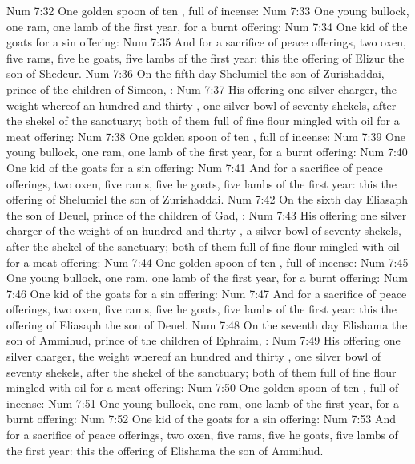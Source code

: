 \vs Num 7:32 One golden spoon of ten , full of incense:
\vs Num 7:33 One young bullock, one ram, one lamb of the first year, for a burnt offering:
\vs Num 7:34 One kid of the goats for a sin offering:
\vs Num 7:35 And for a sacrifice of peace offerings, two oxen, five rams, five he goats, five lambs of the first year: this  the offering of Elizur the son of Shedeur.
\vs Num 7:36 On the fifth day Shelumiel the son of Zurishaddai, prince of the children of Simeon, :
\vs Num 7:37 His offering  one silver charger, the weight whereof  an hundred and thirty , one silver bowl of seventy shekels, after the shekel of the sanctuary; both of them full of fine flour mingled with oil for a meat offering:
\vs Num 7:38 One golden spoon of ten , full of incense:
\vs Num 7:39 One young bullock, one ram, one lamb of the first year, for a burnt offering:
\vs Num 7:40 One kid of the goats for a sin offering:
\vs Num 7:41 And for a sacrifice of peace offerings, two oxen, five rams, five he goats, five lambs of the first year: this  the offering of Shelumiel the son of Zurishaddai.
\vs Num 7:42 On the sixth day Eliasaph the son of Deuel, prince of the children of Gad, :
\vs Num 7:43 His offering  one silver charger of the weight of an hundred and thirty , a silver bowl of seventy shekels, after the shekel of the sanctuary; both of them full of fine flour mingled with oil for a meat offering:
\vs Num 7:44 One golden spoon of ten , full of incense:
\vs Num 7:45 One young bullock, one ram, one lamb of the first year, for a burnt offering:
\vs Num 7:46 One kid of the goats for a sin offering:
\vs Num 7:47 And for a sacrifice of peace offerings, two oxen, five rams, five he goats, five lambs of the first year: this  the offering of Eliasaph the son of Deuel.
\vs Num 7:48 On the seventh day Elishama the son of Ammihud, prince of the children of Ephraim, :
\vs Num 7:49 His offering  one silver charger, the weight whereof  an hundred and thirty , one silver bowl of seventy shekels, after the shekel of the sanctuary; both of them full of fine flour mingled with oil for a meat offering:
\vs Num 7:50 One golden spoon of ten , full of incense:
\vs Num 7:51 One young bullock, one ram, one lamb of the first year, for a burnt offering:
\vs Num 7:52 One kid of the goats for a sin offering:
\vs Num 7:53 And for a sacrifice of peace offerings, two oxen, five rams, five he goats, five lambs of the first year: this  the offering of Elishama the son of Ammihud.
